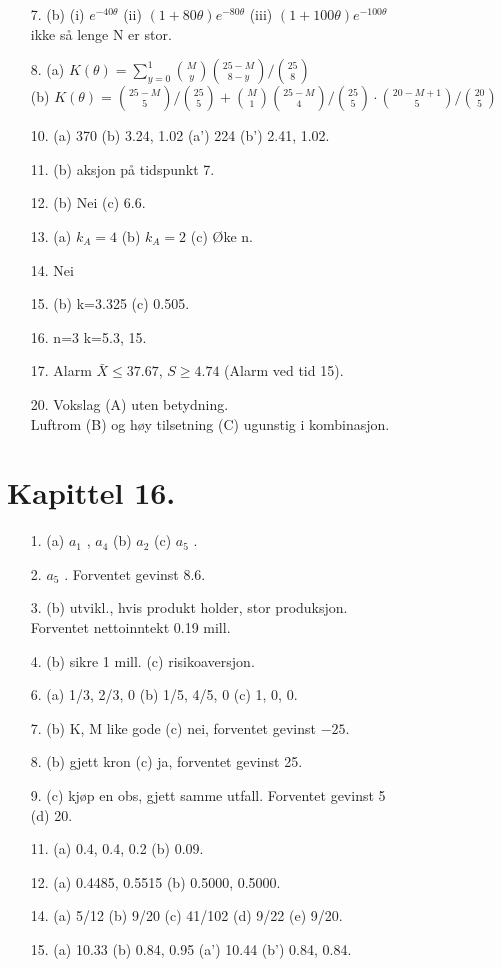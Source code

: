 \begin{itemize}
\item[7.]  (b) (i) $e^{-40\theta}$ (ii) $(1+80\theta )e^{-80\theta}$
               (iii) $(1+100\theta )e^{ -100\theta}$\\
              ikke så lenge N er stor.
\item[8.]  (a) $K(\theta ) =  \sum_{y=0}^1{M\choose y}{25-M\choose 8-y}
                                          /{25\choose 8}$\\
           (b) $K(\theta ) = {25-M\choose 5}/{25\choose 5}+
{M \choose 1}{25-M\choose 4}/{25\choose 5}\cdot 
 {20-M+1\choose 5}/{20\choose 5}$
\item[10.]  (a) 370   (b) 3.24, 1.02  (a') 224  (b') 2.41, 1.02.
\item[11.]  (b) aksjon på tidspunkt 7.
\item[12.]  (b) Nei   (c) 6.6.
\item[13.]  (a) $k_A=4$   (b) $k_A = 2$   (c) Øke n.
\item[14.]  Nei
\item[15.]  (b) k=3.325  (c) 0.505.
\item[16.]   n=3  k=5.3, 15.
\item[17.]  Alarm $\bar{X} \leq 37.67$,  $S \geq 4.74$  (Alarm ved tid 15).
\item[20.] Vokslag (A) uten betydning.\\
           Luftrom (B) og høy tilsetning (C) ugunstig i kombinasjon.
\end{itemize}         
         
         
\section*{Kapittel 16.}

\begin{itemize}         
\item[1.]  (a) $a_1$ , $a_4$    (b) $a_2$    (c) $a_5$ .
\item[2.]  $a_5$ .  Forventet gevinst 8.6.
\item[3.]  (b) utvikl., hvis produkt holder, stor produksjon. \\ Forventet
              nettoinntekt 0.19 mill.
\item[4.]  (b) sikre 1 mill.   (c) risikoaversjon.
\item[6.]  (a) 1/3, 2/3, 0   (b) 1/5, 4/5, 0   (c) 1, 0, 0.
\item[7.]  (b) K, M like gode   (c) nei, forventet gevinst $-25$.
\item[8.]  (b) gjett kron   (c) ja, forventet gevinst 25.
\item[9.]  (c) kjøp en obs, gjett samme utfall.  Forventet gevinst 5\\
              (d) 20.
\item[11.]  (a) 0.4, 0.4, 0.2   (b) 0.09.
\item[12.]  (a) 0.4485, 0.5515   (b) 0.5000, 0.5000.
\item[14.]  (a) 5/12   (b) 9/20   (c) 41/102   (d) 9/22   (e) 9/20.
\item[15.]  (a) 10.33  (b) 0.84, 0.95  (a') 10.44  (b') 0.84, 0.84.
\end{itemize}
         
%
